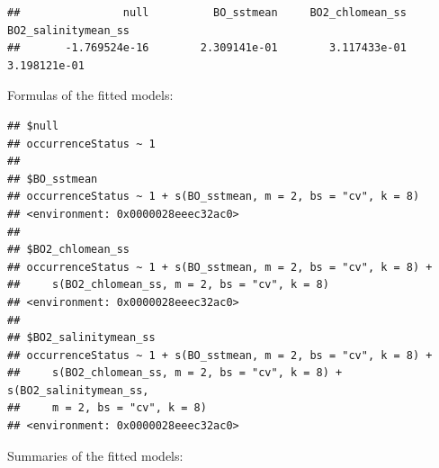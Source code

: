 \documentclass[
]{book}
\newenvironment{Shaded}{\begin{snugshade}}{\end{snugshade}}
\newcommand{\FunctionTok}[1]{\textcolor[rgb]{0.13,0.29,0.53}{\textbf{#1}}}
\newcommand{\NormalTok}[1]{#1}
\newcommand{\SpecialCharTok}[1]{\textcolor[rgb]{0.81,0.36,0.00}{\textbf{#1}}}
\begin{document}
\begin{verbatim}
##                null          BO_sstmean     BO2_chlomean_ss BO2_salinitymean_ss 
##       -1.769524e-16        2.309141e-01        3.117433e-01        3.198121e-01
\end{verbatim}

Formulas of the fitted models:

\begin{Shaded}
\end{Shaded}

\begin{verbatim}
## $null
## occurrenceStatus ~ 1
## 
## $BO_sstmean
## occurrenceStatus ~ 1 + s(BO_sstmean, m = 2, bs = "cv", k = 8)
## <environment: 0x0000028eeec32ac0>
## 
## $BO2_chlomean_ss
## occurrenceStatus ~ 1 + s(BO_sstmean, m = 2, bs = "cv", k = 8) + 
##     s(BO2_chlomean_ss, m = 2, bs = "cv", k = 8)
## <environment: 0x0000028eeec32ac0>
## 
## $BO2_salinitymean_ss
## occurrenceStatus ~ 1 + s(BO_sstmean, m = 2, bs = "cv", k = 8) + 
##     s(BO2_chlomean_ss, m = 2, bs = "cv", k = 8) + s(BO2_salinitymean_ss, 
##     m = 2, bs = "cv", k = 8)
## <environment: 0x0000028eeec32ac0>
\end{verbatim}

Summaries of the fitted models:

\begin{Shaded}
\end{Shaded}
\end{document}
